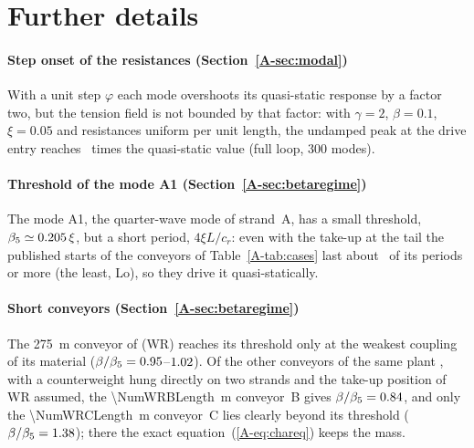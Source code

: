 \section{Further details}\label{supp:details}

\paragraph{Step onset of the resistances (Section~\ref{A-sec:modal})} With a unit step $\varphi$
each mode overshoots its quasi-static response by a factor two, but the tension field is not
bounded by that factor: with $\gamma=2$, $\beta=0.1$, $\xi=0.05$ and resistances uniform per unit
length, the undamped peak at the drive entry reaches \NumStepOvershootEntry\ times the
quasi-static value (full loop, 300 modes).

\paragraph{Threshold of the mode A1 (Section~\ref{A-sec:betaregime})} The mode A1, the
quarter-wave mode of strand~A, has a small threshold, $\beta_5\simeq0.205\,\xi$,
but a short period, $4\xi L/c_r$: even with the take-up at the tail the published starts of the
conveyors of Table~\ref{A-tab:cases} last about \NumAOneStartRatioMin\ of its periods or more (the
least, Lo), so
they drive it quasi-statically.

\paragraph{Short conveyors (Section~\ref{A-sec:betaregime})} The \qty{275}{\metre} conveyor of
\citet{wheatley2021} (WR) reaches its threshold only at the weakest coupling of its material
($\beta/\beta_5=0.95$--$1.02$). Of the other conveyors of the same
plant \citep[Table~1]{wheatley2021}, with a counterweight hung directly on two strands and the
take-up position of WR assumed, the \qty{\NumWRBLength}{\metre} conveyor~B gives
$\beta/\beta_5=0.84$, and only the \qty{\NumWRCLength}{\metre} conveyor~C lies clearly
beyond its threshold ($\beta/\beta_5=1.38$); there the exact
equation~(\ref{A-eq:chareq}) keeps the mass.

